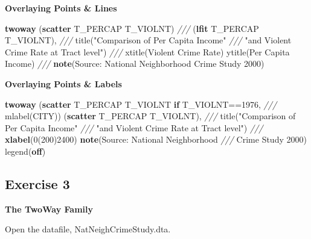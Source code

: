 \documentclass[
]{book}
\newenvironment{Shaded}{\begin{snugshade}}{\end{snugshade}}
\newcommand{\BaseNTok}[1]{\textcolor[rgb]{0.00,0.00,0.81}{#1}}
\newcommand{\CommentTok}[1]{\textcolor[rgb]{0.56,0.35,0.01}{\textit{#1}}}
\newcommand{\KeywordTok}[1]{\textcolor[rgb]{0.13,0.29,0.53}{\textbf{#1}}}
\newcommand{\NormalTok}[1]{#1}
\newcommand{\StringTok}[1]{\textcolor[rgb]{0.31,0.60,0.02}{#1}}
\begin{document}
\textbf{Overlaying Points \& Lines}

\begin{Shaded}
\begin{Highlighting}[]
  \KeywordTok{twoway}\NormalTok{ (}\KeywordTok{scatter}\NormalTok{ T_PERCAP T_VIOLNT) }\CommentTok{///}
\NormalTok{      (}\KeywordTok{lfit}\NormalTok{ T_PERCAP T_VIOLNT), }\CommentTok{///}
      \BaseNTok{title}\NormalTok{(}\StringTok{"Comparison of Per Capita Income"} \CommentTok{///}
            \StringTok{"and Violent Crime Rate at Tract level"}\NormalTok{) }\CommentTok{///}
      \BaseNTok{xtitle}\NormalTok{(Violent Crime Rate) }\BaseNTok{ytitle}\NormalTok{(Per Capita Income) }\CommentTok{///}
      \KeywordTok{note}\NormalTok{(Source: National  Neighborhood Crime Study 2000)}
\end{Highlighting}
\end{Shaded}

\textbf{Overlaying Points \& Labels}

\begin{Shaded}
\begin{Highlighting}[]
  \KeywordTok{twoway}\NormalTok{ (}\KeywordTok{scatter}\NormalTok{ T_PERCAP T_VIOLNT }\KeywordTok{if}\NormalTok{ T_VIOLNT==1976, }\CommentTok{///}
          \BaseNTok{mlabel}\NormalTok{(CITY)) (}\KeywordTok{scatter}\NormalTok{ T_PERCAP T_VIOLNT), }\CommentTok{///}
      \BaseNTok{title}\NormalTok{(}\StringTok{"Comparison of Per Capita Income"} \CommentTok{///}
            \StringTok{"and Violent Crime Rate at Tract level"}\NormalTok{) }\CommentTok{///}
      \KeywordTok{xlabel}\NormalTok{(0(200)2400) }\KeywordTok{note}\NormalTok{(Source: National Neighborhood }\CommentTok{///}
\NormalTok{                              Crime Study 2000) }\BaseNTok{legend}\NormalTok{(}\KeywordTok{off}\NormalTok{)}
\end{Highlighting}
\end{Shaded}

\hypertarget{exercise-3-5}{%
\subsection{Exercise 3}\label{exercise-3-5}}

\textbf{The TwoWay Family}

Open the datafile, NatNeighCrimeStudy.dta.
\end{document}
